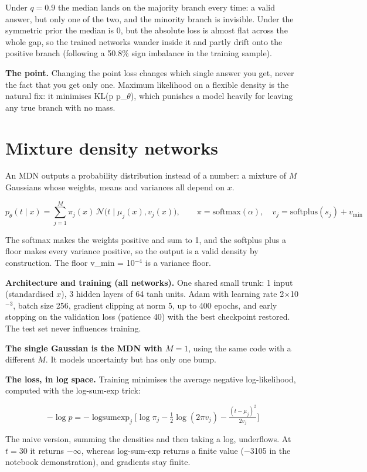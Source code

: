 \documentclass[11pt,a4paper]{article}
\begin{document}
Under $q = 0.9$ the median lands on the majority branch every time: a valid answer, but only one of the two, and the minority branch is invisible. Under the symmetric prior the median is 0, but the absolute loss is almost flat across the whole gap, so the trained networks wander inside it and partly drift onto the positive branch (following a 50.8\% sign imbalance in the training sample).

\textbf{The point.} Changing the point loss changes which single answer you get, never the fact that you get only one. Maximum likelihood on a flexible density is the natural fix: it minimises KL(p \textbar{}\textbar{} p\_$\theta$), which punishes a model heavily for leaving any true branch with no mass.

\section{Mixture density networks}
An MDN outputs a probability distribution instead of a number: a mixture of $M$ Gaussians whose weights, means and variances all depend on $x$.

\[
p_\theta(t\mid x)=\sum_{j=1}^{M}\pi_j(x)\,\mathcal{N}\big(t\mid \mu_j(x),v_j(x)\big),\qquad \pi=\mathrm{softmax}(\alpha),\quad v_j=\mathrm{softplus}(s_j)+v_{\min}
\]

The softmax makes the weights positive and sum to 1, and the softplus plus a floor makes every variance positive, so the output is a valid density by construction. The floor v\_min = 10$^{-4}$ is a variance floor.

\textbf{Architecture and training (all networks).} One shared small trunk: 1 input (standardised $x$), 3 hidden layers of 64 tanh units. Adam with learning rate 2$\times$10$^{-3}$, batch size 256, gradient clipping at norm 5, up to 400 epochs, and early stopping on the validation loss (patience 40) with the best checkpoint restored. The test set never influences training.

\textbf{The single Gaussian is the MDN with $M = 1$}, using the same code with a different $M$. It models uncertainty but has only one bump.

\textbf{The loss, in log space.} Training minimises the average negative log-likelihood, computed with the log-sum-exp trick:

\[
-\log p=-\operatorname{logsumexp}_j\Big[\log\pi_j-\tfrac12\log(2\pi v_j)-\tfrac{(t-\mu_j)^2}{2v_j}\Big]
\]

The naive version, summing the densities and then taking a log, underflows. At $t = 30$ it returns $-$$\infty$, whereas log-sum-exp returns a finite value ($-$3105 in the notebook demonstration), and gradients stay finite.
\end{document}

